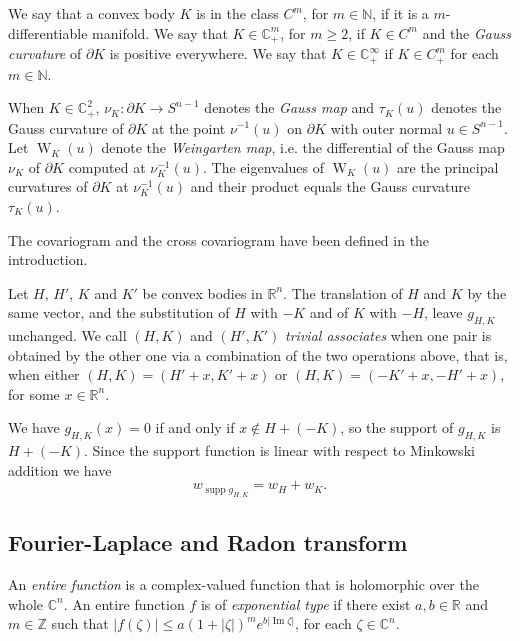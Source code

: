 \documentclass[a4paper]{amsart}
\theoremstyle{definition}
\numberwithin{equation}{section}
\begin{document}
We say that a convex body $K$ is in the class $C^m$, for $m\in{\mathbb{N}}$, if it is a $m$-differentiable manifold.  We say that $K\in{\mathbb{C}}^m_+$, for $m\geq2$, if $K\in C^m$ and the \emph{Gauss curvature} of ${{\partial}} K$ is positive everywhere.    We say that  $K\in{\mathbb{C}}^\infty_+$ if $K\in C^m_+$ for each $m\in{\mathbb{N}}$. 

When $K\in{\mathbb{C}}^2_+$, $\nu_K:{{\partial}} K\to{S^{n-1}}$ denotes the \emph{Gauss map} and ${\tau}_K(u)$ denotes the Gauss curvature of ${{\partial}} K$ at the point  $\nu^{-1}(u)$ on ${{\partial}} K$ with outer normal $u\in{S^{n-1}}$.
Let ${{\mathop{W}}}_K(u)$ denote the \emph{Weingarten map}, i.e. the differential of the {Gauss map} $\nu_K$ of ${{\partial}} K$ computed at $\nu^{-1}_K(u)$.
The eigenvalues of ${{\mathop{W}}}_K(u)$ are the principal curvatures of ${{\partial}} K$ at $\nu^{-1}_K(u)$ and their product equals the Gauss curvature  ${\tau}_K(u)$.

The covariogram and the cross covariogram have been defined in the introduction.

Let $H$, $H'$, $K$ and $K'$ be convex bodies in  ${\mathbb{R}}^n$.
The translation of $H$ and $K$ by the same vector, and the substitution of $H$ with $-K$ and of $K$ with $-H$, leave $g_{H,K}$ unchanged.  We call $(H,K)$ and $(H',K')$ \emph{trivial associates} when one pair is obtained by the other one via a combination of the two operations above, that is, when either $(H,K)=(H'+x,K'+x)$ or $(H,K)=(-K'+x,-H'+x)$, for some $x\in {\mathbb{R}}^n$.

We have $g_{H,K}(x)=0$  if and only if $x\notin H+(-K)$, so the support of $g_{H,K}$ is $H+(-K)$. Since the support function is linear with respect to Minkowski addition we have
\begin{equation}\label{width_of_support}
{{{w}}}_{{{\operatorname{supp}}} g_{H,K}}={{{w}}}_H+{{{w}}}_K.
\end{equation}

\subsection{Fourier-Laplace  and Radon transform}
An \emph{entire function} is a complex-valued function that is holomorphic over the whole ${\mathbb{C}}^n$. An entire function $f$ is of \emph{exponential type} if there exist $a, b\in{\mathbb{R}}$ and $m\in\mathbb{Z}$ such that $|f({{\zeta}})|\leq a(1+|{{\zeta}}|)^m e^{b |{\operatorname{Im}} {{\zeta}}|}$, for each ${{\zeta}}\in{\mathbb{C}}^n$.
\end{document}
